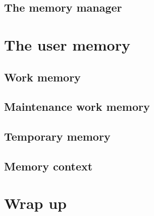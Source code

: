 \subsection{The memory manager}
\section{The user memory}
\subsection{Work memory}
\subsection{Maintenance work memory}
\subsection{Temporary memory}


\subsection{Memory context}

\section{Wrap up}
